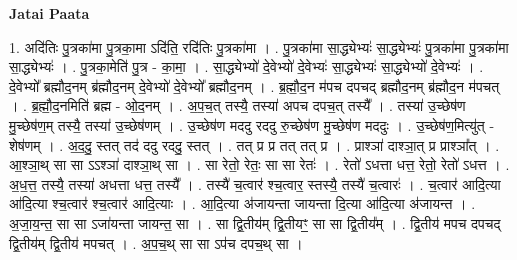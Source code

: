 \documentclass[17pt]{extarticle}
\begin{document}
\textbf{Jatai Paata} \newline

1. अदि॑तिः पु॒त्रका॑मा पु॒त्रका॒मा ऽदि॑ति॒ रदि॑तिः पु॒त्रका॑मा । . पु॒त्रका॑मा सा॒द्ध्येभ्यः॑ सा॒द्ध्येभ्यः॑ पु॒त्रका॑मा पु॒त्रका॑मा सा॒द्ध्येभ्यः॑ । . पु॒त्रका॒मेति॑ पु॒त्र - का॒मा॒ । . सा॒द्ध्येभ्यो॑ दे॒वेभ्यो॑ दे॒वेभ्यः॑ सा॒द्ध्येभ्यः॑ सा॒द्ध्येभ्यो॑ दे॒वेभ्यः॑ । . दे॒वेभ्यो᳚ ब्रह्मौद॒नम् ब्र॑ह्मौद॒नम् दे॒वेभ्यो॑ दे॒वेभ्यो᳚ ब्रह्मौद॒नम् । . ब्र॒ह्मौ॒द॒न म॑पच दपचद् ब्रह्मौद॒नम् ब्र॑ह्मौद॒न म॑पचत् । . ब्र॒ह्मौ॒द॒नमिति॑ ब्रह्म - ओ॒द॒नम् । . अ॒प॒च॒त् तस्यै॒ तस्या॑ अपच दपच॒त् तस्यै᳚ । . तस्या॑ उ॒च्छेष॑ण मु॒च्छेष॑ण॒म् तस्यै॒ तस्या॑ उ॒च्छेष॑णम् । . उ॒च्छेष॑ण मददु रददु रु॒च्छेष॑ण मु॒च्छेष॑ण मददुः । . उ॒च्छेष॑ण॒मित्यु॑त् - शेष॑णम् । . अ॒द॒दु॒ स्तत् तद॑ ददु रददु॒ स्तत् । . तत् प्र प्र तत् तत् प्र । . प्राश्ञा॑ दाश्ञा॒त् प्र प्राश्ञा᳚त् । . आ॒श्ञा॒थ् सा सा ऽऽश्ञा॑ दाश्ञा॒थ् सा । . सा रेतो॒ रेतः॒ सा सा रेतः॑ । . रेतो॑ ऽधत्ता धत्त॒ रेतो॒ रेतो॑ ऽधत्त । . अ॒ध॒त्त॒ तस्यै॒ तस्या॑ अधत्ता धत्त॒ तस्यै᳚ । . तस्यै॑ च॒त्वार॑ श्च॒त्वार॒ स्तस्यै॒ तस्यै॑ च॒त्वारः॑ । . च॒त्वार॑ आदि॒त्या आ॑दि॒त्या श्च॒त्वार॑ श्च॒त्वार॑ आदि॒त्याः । . आ॒दि॒त्या अ॑जायन्ता जायन्ता दि॒त्या आ॑दि॒त्या अ॑जायन्त । . अ॒जा॒य॒न्त॒ सा सा ऽजा॑यन्ता जायन्त॒ सा । . सा द्वि॒तीय॑म् द्वि॒तीयꣳ॒॒ सा सा द्वि॒तीय᳚म् । . द्वि॒तीय॑ मपच दपचद् द्वि॒तीय॑म् द्वि॒तीय॑ मपचत् । . अ॒प॒च॒थ् सा सा ऽप॑च दपच॒थ् सा । \newline
\end{document}
